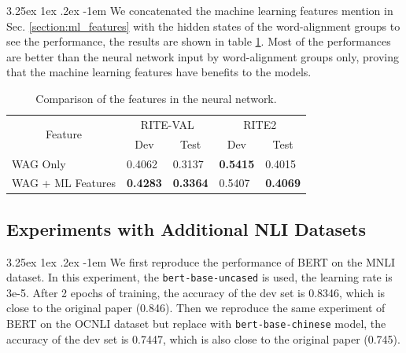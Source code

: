 \documentclass[12pt]{article}
\makeatletter
\renewcommand\paragraph{\@startsection{paragraph}{5}{\z@}%
  {3.25ex \@plus1ex \@minus.2ex}%
  {-1em}%
  {\normalfont\normalsize\bfseries}}
\makeatother
\begin{document}
\begin{CJK*}{UTF8}{bkai}
\begin{spacing}{1.77}
\paragraph{}
We concatenated the machine learning features mention in Sec. \ref{section:ml_features} with the hidden states of the word-alignment groups to see the performance, the results are shown in table \ref{result:csa_nn}. Most of the performances are better than the neural network input by word-alignment groups only, proving that the machine learning features have benefits to the models.

\begin{table}[H]
  \centering
  \setlength{\extrarowheight}{-3pt}
  \caption{Comparison of the features in the neural network.}
  \label{result:csa_nn}
  \begin{tabular}{|l|l|l|l|l|}
  \hline
  \multicolumn{1}{|c|}{\multirow{2}{*}{Feature}} & \multicolumn{2}{c|}{RITE-VAL} & \multicolumn{2}{c|}{RITE2} \\ \cline{2-5}
  \multicolumn{1}{|c|}{} & \multicolumn{1}{c|}{Dev} & \multicolumn{1}{c|}{Test} & \multicolumn{1}{c|}{Dev} & \multicolumn{1}{c|}{Test} \\ \hline
  WAG Only & 0.4062 & 0.3137 & \textbf{0.5415} & 0.4015 \\ \hline
  WAG   + ML Features & \textbf{0.4283} & \textbf{0.3364} & 0.5407 & \textbf{0.4069} \\ \hline
  \end{tabular}
\end{table}

\subsection{Experiments with Additional NLI Datasets}
\paragraph{}
We first reproduce the performance of BERT on the MNLI dataset. In this experiment, the \texttt{bert-base-uncased} is used, the learning rate is 3e-5. After 2 epochs of training, the accuracy of the dev set is 0.8346, which is close to the original paper (0.846). Then we reproduce the same experiment of BERT on the OCNLI dataset but replace with \texttt{bert-base-chinese} model, the accuracy of the dev set is 0.7447, which is also close to the original paper (0.745).


\end{spacing}
\end{CJK*}
\end{document}
